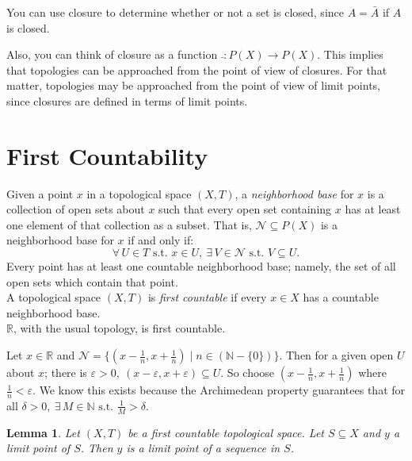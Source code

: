 \documentclass[12pt]{report}
\newcommand{\example}{  \noindent{\sc Example }\hspace{5pt} }
\newcommand{\define}{  \noindent{\sc Definition }\hspace{5pt} }
\newcommand{\fall}{\forall\,}
\newcommand{\exst}{\exists\,}
\newcommand{\st}{\textrm{ s.t. }}
\newcommand{\reals}{\mathbb{R}}
\newcommand{\naturals}{\mathbb{N}}
\newtheorem{lemma}[theorem]{Lemma}
\begin{document}
You can use closure to determine whether or not a set is closed, since $A =
\bar{A}$ if $A$ is closed. 

Also, you can think of closure as a function $\bar{}:P(X)\rightarrow P(X)$.
This implies that topologies can be approached from the point of view of
closures. For that matter, topologies may be approached from the point of view
of limit points, since closures are defined in terms of limit points.







\section{First Countability}

\define Given a point $x$ in a topological space $(X, T)$, a  {\em neighborhood base} for $x$ is a collection of open sets about $x$
such that every open set containing $x$ has at least one element of that
collection as a subset. That is, $\mathcal{N} \subseteq P(X)$ is a neighborhood base for
$x$ if and only if: 
\begin{displaymath}
\fall U \in T \st x \in U,\ \exst V \in \mathcal{N} \st V \subseteq U.
\end{displaymath}
Every point has at least one countable neighborhood base; namely, the set of
all open sets which contain that point.\\

\define A topological space $(X,T)$ is  {\em first
countable} if every $x \in X$ has a countable neighborhood base.\\

\example $\reals$, with the usual topology, is first countable.

Let $x \in \reals$ and 
$\mathcal{N} = \{(x - \frac{1}{n}, x + \frac{1}{n}) \mid n \in (\naturals - \{0\})\}$.
Then for a given open $U$ about $x$; there is $\varepsilon > 0,\ (x -
\varepsilon, x + \varepsilon) \subseteq U$.  So choose $(x - \frac{1}{n}, x +
\frac{1}{n})$ where $\frac{1}{n} < \varepsilon$. We know this exists because
the Archimedean property guarantees that for all $\delta > 0,\ \exst M \in
\naturals \st \frac{1}{M} > \delta$.\\

\begin{lemma}
\label{firstcountablesequencelemma}
Let $(X,T)$ be a first countable topological space. 
Let $S \subseteq X$ and $y$ a limit point of $S$. Then $y$ is a limit 
point of a sequence in $S$.
\end{lemma}
\end{document}
